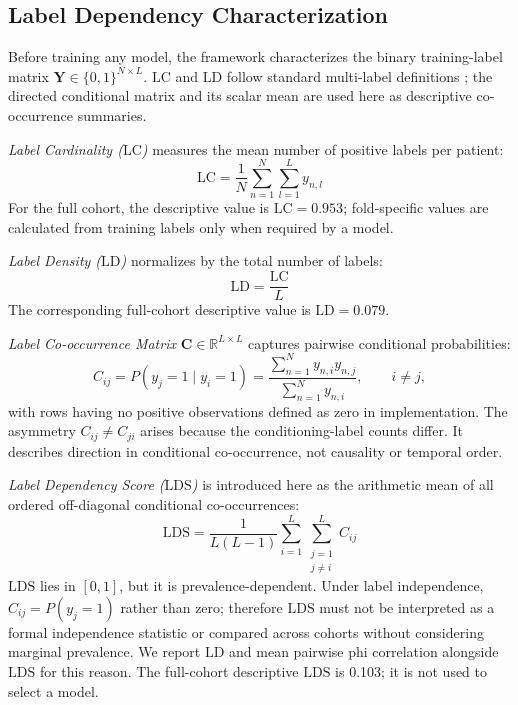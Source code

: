 \documentclass{ieeeaccess}
\begin{document}
\subsection{Label Dependency Characterization}

Before training any model, the framework characterizes the binary training-label matrix $\mathbf{Y} \in \{0, 1\}^{N \times L}$. $\mathrm{LC}$ and $\mathrm{LD}$ follow standard multi-label definitions \cite{tsoumakas2007b,charte2015}; the directed conditional matrix and its scalar mean are used here as descriptive co-occurrence summaries.

\textit{Label Cardinality ($\mathrm{LC}$)} measures the mean number of positive labels per patient:
\begin{equation}
\mathrm{LC} = \frac{1}{N}\sum_{n=1}^{N}\sum_{l=1}^{L} y_{n,l}
\label{eq:lc}
\end{equation}
For the full cohort, the descriptive value is $\mathrm{LC} = 0.953$; fold-specific values are calculated from training labels only when required by a model.

\textit{Label Density ($\mathrm{LD}$)} normalizes by the total number of labels:
\begin{equation}
\mathrm{LD} = \frac{\mathrm{LC}}{L}
\label{eq:ld}
\end{equation}
The corresponding full-cohort descriptive value is $\mathrm{LD} = 0.079$.

\textit{Label Co-occurrence Matrix} $\mathbf{C} \in \mathbb{R}^{L \times L}$ captures pairwise conditional probabilities:
\begin{equation}
C_{ij} = P(y_j = 1 \mid y_i = 1) = \frac{\sum_{n=1}^{N} y_{n,i}y_{n,j}}{\sum_{n=1}^{N} y_{n,i}}, \qquad i\neq j,
\label{eq:cooc}
\end{equation}
with rows having no positive observations defined as zero in implementation. The asymmetry $C_{ij} \neq C_{ji}$ arises because the conditioning-label counts differ. It describes direction in conditional co-occurrence, not causality or temporal order.

\textit{Label Dependency Score ($\mathrm{LDS}$)} is introduced here as the arithmetic mean of all ordered off-diagonal conditional co-occurrences:
\begin{equation}
\mathrm{LDS} = \frac{1}{L(L-1)}\sum_{i=1}^{L}\sum_{\substack{j=1 \\ j \neq i}}^{L} C_{ij}
\label{eq:lds}
\end{equation}
$\mathrm{LDS}$ lies in $[0,1]$, but it is prevalence-dependent. Under label independence, $C_{ij}=P(y_j=1)$ rather than zero; therefore $\mathrm{LDS}$ must not be interpreted as a formal independence statistic or compared across cohorts without considering marginal prevalence. We report $\mathrm{LD}$ and mean pairwise phi correlation alongside $\mathrm{LDS}$ for this reason. The full-cohort descriptive $\mathrm{LDS}$ is 0.103; it is not used to select a model.
\end{document}
